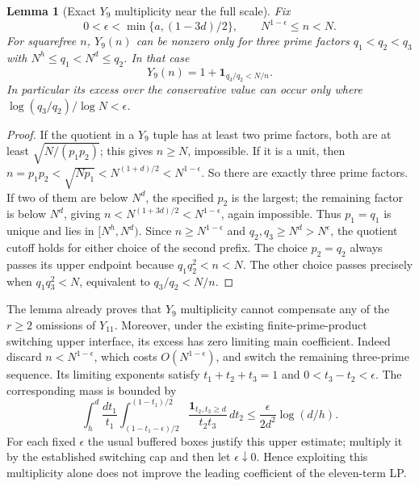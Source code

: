 \documentclass[11pt]{article}
\newtheorem{lemma}[theorem]{Lemma}
\begin{document}
\begin{lemma}[Exact $Y_9$ multiplicity near the full scale]
Fix
\[
 0<\epsilon<\min\{a,(1-3d)/2\},\qquad N^{1-\epsilon}\le n<N.
\]
For squarefree $n$, $Y_9(n)$ can be nonzero only for three prime factors
$q_1<q_2<q_3$ with $N^h\le q_1<N^d\le q_2$.
In that case
\[
 Y_9(n)=1+\mathbf1_{q_3/q_2<N/n}.
\]
In particular its excess over the conservative value can occur only
where $\log(q_3/q_2)/\log N<\epsilon$.
\end{lemma}

\begin{proof}
If the quotient in a $Y_9$ tuple has at least two prime factors,
both are at least $\sqrt{N/(p_1p_2)}$; this gives $n\ge N$, impossible.
If it is a unit, then
$n=p_1p_2<\sqrt{Np_1}<N^{(1+d)/2}<N^{1-\epsilon}$.
So there are exactly three prime factors.
If two of them are below $N^d$, the specified $p_2$ is the largest;
the remaining factor is below $N^d$, giving
$n<N^{(1+3d)/2}<N^{1-\epsilon}$, again impossible.
Thus $p_1=q_1$ is unique and lies in $[N^h,N^d)$.
Since $n\ge N^{1-\epsilon}$ and $q_2,q_3\ge N^d>N^\epsilon$,
the quotient cutoff holds for either choice of the second prefix.
The choice $p_2=q_2$ always passes its upper endpoint because
$q_1q_2^2<n<N$.  The other choice passes precisely when
$q_1q_3^2<N$, equivalent to $q_3/q_2<N/n$.
\end{proof}

The lemma already proves that $Y_9$ multiplicity cannot compensate
any of the $r\ge2$ omissions of $Y_{11}$.  Moreover, under the existing
finite-prime-product switching upper interface, its excess has zero
limiting main coefficient.  Indeed discard $n<N^{1-\epsilon}$,
which costs $O(N^{1-\epsilon})$, and switch the remaining three-prime
sequence.  Its limiting exponents satisfy
$t_1+t_2+t_3=1$ and $0<t_3-t_2<\epsilon$.
The corresponding mass is bounded by
\[
 \int_h^d\frac{dt_1}{t_1}
 \int_{(1-t_1-\epsilon)/2}^{(1-t_1)/2}
 \frac{\mathbf1_{t_2,t_3\ge d}}{t_2t_3}\,dt_2
 \le\frac{\epsilon}{2d^2}\log(d/h).
\]
For each fixed $\epsilon$ the usual buffered boxes justify this upper
estimate; multiply it by the established switching cap and then let
$\epsilon\downarrow0$.  Hence exploiting this multiplicity alone
does not improve the leading coefficient of the eleven-term LP.
\end{document}

